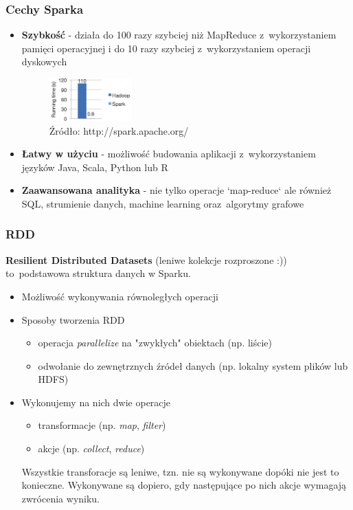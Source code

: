 \documentclass{beamer}\usepackage[]{graphicx}\usepackage[]{color}
\begin{document}
\begin{frame}
\frametitle{Cechy Sparka}
\begin{itemize}
\item \textbf{Szybkość} - działa do 100 razy szybciej niż MapReduce z~wykorzystaniem pamięci operacyjnej i do 10 razy szybciej z~wykorzystaniem operacji dyskowych 
  \begin{figure}
  \includegraphics[width=0.3\textwidth]{logistic-regression.png}
  \vspace{-10pt}
  \caption{Źródło: http://spark.apache.org/}
  \end{figure}
\item \textbf{Łatwy w użyciu} - możliwość budowania aplikacji z~wykorzystaniem języków Java, Scala, Python lub R
\item \textbf{Zaawansowana analityka} - nie tylko operacje `map-reduce` ale również SQL, strumienie danych, machine learning oraz~algorytmy grafowe
\end{itemize}
\end{frame}

\begin{frame}
\frametitle{RDD}
\textbf{Resilient Distributed Datasets} (leniwe kolekcje rozproszone :)) to~podstawowa struktura danych w Sparku. 
\begin{itemize}
\item Możliwość wykonywania równoległych operacji
\item Sposoby tworzenia RDD
\begin{itemize}
\item operacja \textit{parallelize} na "zwykłych" obiektach (np. liście) 
\item odwołanie do zewnętrznych źródeł danych (np. lokalny system plików lub HDFS)
\end{itemize}
\item Wykonujemy na nich dwie operacje
\begin{itemize}
\item transformacje (np. \textit{map}, \textit{filter})
\item akcje (np. \textit{collect}, \textit{reduce})
\end{itemize}
Wszystkie transforacje są leniwe, tzn. nie są wykonywane dopóki nie jest to konieczne. Wykonywane są dopiero, gdy następujące po nich akcje wymagają zwrócenia wyniku. 
\end{itemize}
\end{frame}
\end{document}

